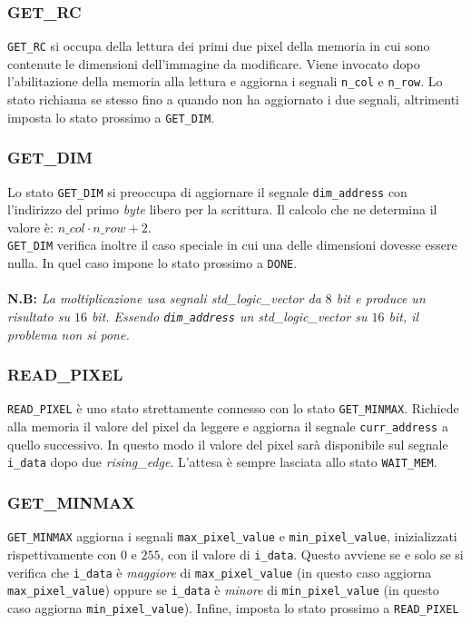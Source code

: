 \documentclass[11pt, a4paper]{article}
\begin{document}
\subsubsection{GET\_RC}
\texttt{GET\_RC} si occupa della lettura dei primi due pixel della memoria in cui sono contenute le dimensioni dell’immagine da modificare. Viene invocato dopo l'abilitazione della memoria alla lettura e aggiorna i segnali \texttt{n\_col} e \texttt{n\_row}. Lo stato richiama se stesso fino a quando non ha aggiornato i due segnali, altrimenti imposta lo stato prossimo a \texttt{GET\_DIM}.

\subsubsection{GET\_DIM}
Lo stato \texttt{GET\_DIM} si preoccupa di aggiornare il segnale \texttt{dim\_address} con l'indirizzo del primo \textit{byte} libero per la scrittura. Il calcolo che ne determina il valore è: $n\_col \cdot n\_row + 2$.\\
\texttt{GET\_DIM} verifica inoltre il caso speciale in cui una delle dimensioni dovesse essere nulla. In quel caso impone lo stato prossimo a \texttt{DONE}.\\ \\
\textbf{N.B:}\textit{
La moltiplicazione usa segnali \textit{std\_logic\_vector} da $8$ bit e produce un risultato su $16$ bit. Essendo \texttt{dim\_address} un \textit{std\_logic\_vector} su $16$ bit, il problema non si pone.
}

\subsubsection{READ\_PIXEL}
\texttt{READ\_PIXEL} è uno stato strettamente connesso con lo stato \texttt{GET\_MINMAX}. Richiede alla memoria il valore del pixel da leggere e aggiorna il segnale \texttt{curr\_address} a quello successivo. In questo modo il valore del pixel sarà disponibile sul segnale \texttt{i\_data} dopo due \textit{rising\_edge}. L'attesa è sempre lasciata allo stato \texttt{WAIT\_MEM}.

\subsubsection{GET\_MINMAX}
\texttt{GET\_MINMAX} aggiorna i segnali \texttt{max\_pixel\_value} e \texttt{min\_pixel\_value}, inizializzati rispettivamente con $0$ e $255$, con il valore di \texttt{i\_data}. Questo avviene se e solo se si verifica che \texttt{i\_data} è \textit{maggiore} di \texttt{max\_pixel\_value} (in questo caso aggiorna \texttt{max\_pixel\_value}) oppure se \texttt{i\_data} è \textit{minore} di \texttt{min\_pixel\_value} (in questo caso aggiorna \texttt{min\_pixel\_value}). Infine, imposta lo stato prossimo a \texttt{READ\_PIXEL}
\end{document}
